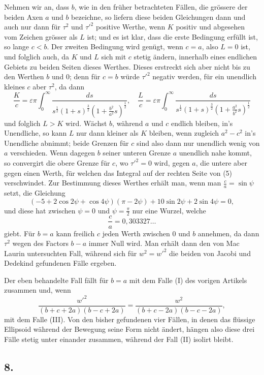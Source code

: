 \documentclass[12pt,a4paper]{article}
\begin{document}
Nehmen wir an, dass $b$, wie in den früher betrachteten Fällen, die grössere der beiden Axen $a$ und $b$ bezeichne, so liefern diese beiden Gleichungen dann und auch nur dann für $\tau^2$ und $\tau'^2$ positive Werthe, wenn $K$ positiv und abgesehen vom Zeichen grösser als $L$ ist; und es ist klar, dass die erste Bedingung erfüllt ist, so lange $c < b$. Der zweiten Bedingung wird genügt, wenn $c = a$, also $L = 0$ ist, und folglich auch, da $K$ und $L$ sich mit $c$ stetig ändern, innerhalb eines endlichen Gebiets zu beiden Seiten dieses Werthes. Dieses erstreckt sich aber nicht bis zu den Werthen $b$ und $0$; denn für $c = b$ würde $\tau'^2$ negativ werden, für ein unendlich kleines $c$ aber $\tau^2$, da dann
\[
\frac{K}{c} = \varepsilon\pi\int_0^{\infty}\!\frac{ds}{s^{\frac{1}{2}}(1+s)^{\frac{3}{2}}(1+\frac{b^2}{a^2}s)^{\frac{1}{2}}},\quad
\frac{L}{c} = \varepsilon\pi\int_0^{\infty}\!\frac{ds}{s^{\frac{1}{2}}(1+s)^{\frac{3}{2}}(1+\frac{a^2}{b^2}s)^{\frac{1}{2}}}
\]
und folglich $L > K$ wird. Wächst $b$, während $a$ und $c$ endlich bleiben, in's Unendliche, so kann $L$ nur dann kleiner als $K$ bleiben, wenn zugleich $a^2 - c^2$ in's Unendliche abnimmt; beide Grenzen für $c$ sind also dann nur unendlich wenig von $a$ verschieden. Wenn dagegen $b$ seiner unteren Grenze $a$ unendlich nahe kommt, so convergirt die obere Grenze für $c$, wo $\tau'^2 = 0$ wird, gegen $a$, die untere aber gegen einen Werth, für welchen das Integral auf der rechten Seite von (5) verschwindet. Zur Bestimmung dieses Werthes erhält man, wenn man $\frac{c}{a} = \sin\psi$ setzt, die Gleichung
\[ (-5 + 2\cos 2\psi + \cos 4\psi)(\pi - 2\psi) + 10\sin 2\psi + 2\sin 4\psi = 0, \]
und diese hat zwischen $\psi = 0$ und $\psi = \frac{\pi}{2}$ nur eine Wurzel, welche
\[ \frac{c}{a} = 0{,}303327\ldots \]
giebt. Für $b = a$ kann freilich $c$ jeden Werth zwischen $0$ und $b$ annehmen, da dann $\tau^2$ wegen des Factors $b-a$ immer Null wird. Man erhält dann den von Mac Laurin untersuchten Fall, während sich für $w^2 = w'^2$ die beiden von Jacobi und Dedekind gefundenen Fälle ergeben.

Der eben behandelte Fall fällt für $b = a$ mit dem Falle (I) des vorigen Artikels zusammen und, wenn
\[ \frac{w'^2}{(b+c+2a)(b-c+2a)} = \frac{w^2}{(b+c-2a)(b-c-2a)}, \]
mit dem Falle (III). Von den bisher gefundenen vier Fällen, in denen das flüssige Ellipsoid während der Bewegung seine Form nicht ändert, hängen also diese drei Fälle stetig unter einander zusammen, während der Fall (II) isolirt bleibt.

\subsection*{8.}
\end{document}
